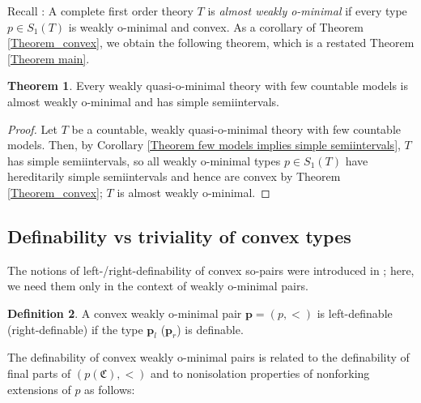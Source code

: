 \documentclass{amsart}
\theoremstyle{definition}
\newtheorem{Theorem}{Theorem}[section]
\theoremstyle{definition}
\newtheorem{Definition}[Theorem]{Definition}
\newcommand{\Mon}{\mathfrak C}
\begin{document}
Recall \cite[Definition 3.7]{MTwqom1}: A complete first order theory $T$ is {\em almost weakly o-minimal} if every type $p\in S_1(T)$ is weakly o-minimal and convex.
As a corollary of Theorem \ref{Theorem_convex}, we obtain the following theorem, which is a restated Theorem \ref{Theorem main}.

\begin{Theorem}
Every weakly quasi-o-minimal theory with few countable models is almost weakly o-minimal and has simple semiintervals.   
\end{Theorem}
\begin{proof} 
Let $T$ be a countable, weakly quasi-o-minimal theory with few countable models. Then, by Corollary \ref{Theorem few models implies simple semiintervals}, $T$ has simple semiintervals, so all weakly o-minimal types $p\in S_1(T)$ have hereditarily simple semiintervals and hence are convex by Theorem \ref{Theorem_convex}; $T$ is almost weakly o-minimal.
\end{proof}



\subsection{Definability vs triviality of convex types}\label{Subsection def triv}


The notions of left-/right-definability of convex so-pairs were introduced in \cite{MT}; here, we need them only in the context of weakly o-minimal pairs.   

\begin{Definition}
A convex weakly o-minimal pair $\mathbf p=(p,<)$ is left-definable (right-definable) if the type $\mathbf p_l$ ($\mathbf p_r$) is definable.  
\end{Definition}


The definability of convex weakly o-minimal pairs is related to the definability of final parts of $(p(\Mon),<)$ and to nonisolation properties of nonforking extensions of $p$ as follows:
\end{document}
